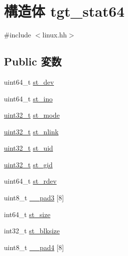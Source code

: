 \hypertarget{structSparc32Linux_1_1tgt__stat64}{
\section{構造体 tgt\_\-stat64}
\label{structSparc32Linux_1_1tgt__stat64}
}


{\ttfamily \#include $<$linux.hh$>$}\subsection*{Public 変数}
\begin{DoxyCompactItemize}
\item 
uint64\_\-t \hyperlink{structSparc32Linux_1_1tgt__stat64_a0146849d3da5c91d9776888b14b82dcc}{st\_\-dev}
\item 
uint64\_\-t \hyperlink{structSparc32Linux_1_1tgt__stat64_abb54f0e7d91659ba9f4ab77a5392c08a}{st\_\-ino}
\item 
\hyperlink{Type_8hh_a435d1572bf3f880d55459d9805097f62}{uint32\_\-t} \hyperlink{structSparc32Linux_1_1tgt__stat64_a75f55d064ed3b380b0315de36e178885}{st\_\-mode}
\item 
\hyperlink{Type_8hh_a435d1572bf3f880d55459d9805097f62}{uint32\_\-t} \hyperlink{structSparc32Linux_1_1tgt__stat64_ab77c257c135fa586e930ef0bf0977c08}{st\_\-nlink}
\item 
\hyperlink{Type_8hh_a435d1572bf3f880d55459d9805097f62}{uint32\_\-t} \hyperlink{structSparc32Linux_1_1tgt__stat64_ad5477a292a4edf27aa5766e01e0f5d1f}{st\_\-uid}
\item 
\hyperlink{Type_8hh_a435d1572bf3f880d55459d9805097f62}{uint32\_\-t} \hyperlink{structSparc32Linux_1_1tgt__stat64_a1faa6012541b83fd5218e2b229f876ec}{st\_\-gid}
\item 
uint64\_\-t \hyperlink{structSparc32Linux_1_1tgt__stat64_ac430407fd3b0e421da1ee8f66c95a786}{st\_\-rdev}
\item 
uint8\_\-t \hyperlink{structSparc32Linux_1_1tgt__stat64_aecf48dab135e58123bca251b6d81bf36}{\_\-\_\-pad3} \mbox{[}8\mbox{]}
\item 
int64\_\-t \hyperlink{structSparc32Linux_1_1tgt__stat64_aec608d79c93ed6d010aec9f7487e0064}{st\_\-size}
\item 
int32\_\-t \hyperlink{structSparc32Linux_1_1tgt__stat64_a10c65d9bc94bb57004da3be985b096a2}{st\_\-blksize}
\item 
uint8\_\-t \hyperlink{structSparc32Linux_1_1tgt__stat64_ac176f8ba23c6cbf8c4fe0b1a53937d17}{\_\-\_\-pad4} \mbox{[}8\mbox{]}

\end{DoxyCompactItemize}
